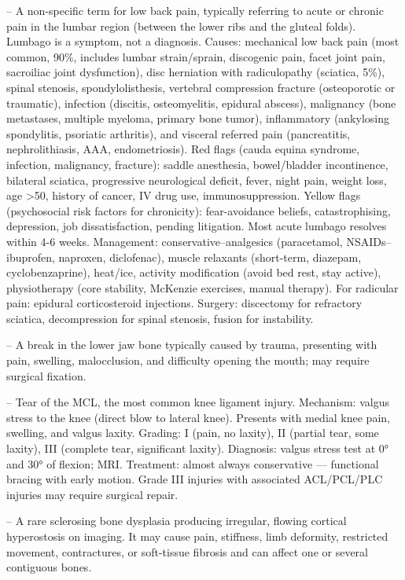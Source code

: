 -- A non-specific term for low back pain, typically referring to acute or chronic pain in the lumbar region (between the lower ribs and the gluteal folds). Lumbago is a symptom, not a diagnosis. Causes: mechanical low back pain (most common, 90\%, includes lumbar strain/sprain, discogenic pain, facet joint pain, sacroiliac joint dysfunction), disc herniation with radiculopathy (sciatica, 5\%), spinal stenosis, spondylolisthesis, vertebral compression fracture (osteoporotic or traumatic), infection (discitis, osteomyelitis, epidural abscess), malignancy (bone metastases, multiple myeloma, primary bone tumor), inflammatory (ankylosing spondylitis, psoriatic arthritis), and visceral referred pain (pancreatitis, nephrolithiasis, AAA, endometriosis). Red flags (cauda equina syndrome, infection, malignancy, fracture): saddle anesthesia, bowel/bladder incontinence, bilateral sciatica, progressive neurological deficit, fever, night pain, weight loss, age >50, history of cancer, IV drug use, immunosuppression. Yellow flags (psychosocial risk factors for chronicity): fear-avoidance beliefs, catastrophising, depression, job dissatisfaction, pending litigation. Most acute lumbago resolves within 4-6 weeks. Management: conservative--analgesics (paracetamol, NSAIDs--ibuprofen, naproxen, diclofenac), muscle relaxants (short-term, diazepam, cyclobenzaprine), heat/ice, activity modification (avoid bed rest, stay active), physiotherapy (core stability, McKenzie exercises, manual therapy). For radicular pain: epidural corticosteroid injections. Surgery: discectomy for refractory sciatica, decompression for spinal stenosis, fusion for instability.

-- A break in the lower jaw bone typically caused by trauma, presenting with pain, swelling, malocclusion, and difficulty opening the mouth; may require surgical fixation.

-- Tear of the MCL, the most common knee ligament injury. Mechanism: valgus stress to the knee (direct blow to lateral knee). Presents with medial knee pain, swelling, and valgus laxity. Grading: I (pain, no laxity), II (partial tear, some laxity), III (complete tear, significant laxity). Diagnosis: valgus stress test at 0° and 30° of flexion; MRI. Treatment: almost always conservative — functional bracing with early motion. Grade III injuries with associated ACL/PCL/PLC injuries may require surgical repair.

-- A rare sclerosing bone dysplasia producing irregular, flowing cortical hyperostosis on imaging. It may cause pain, stiffness, limb deformity, restricted movement, contractures, or soft-tissue fibrosis and can affect one or several contiguous bones.

